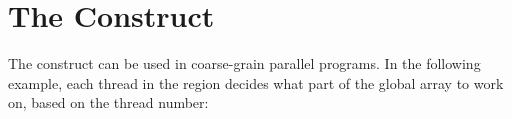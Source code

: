 \pagebreak
\chapter{The  Construct}
\label{chap:parallel}

The  construct  can be used in coarse-grain parallel programs. 
In the following example, each thread in the  region decides what 
part of the global array  to work on, based on the thread number:



